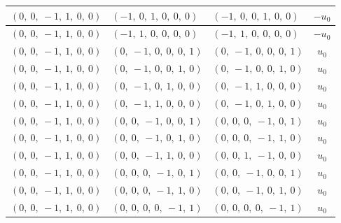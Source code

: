 \documentclass[11pt]{article}
\theoremstyle{definition}
\begin{document}
\begin{longtable}{|l|l|l|c|}
    \hline
    $\left( 0, \  0, \  -1, \  1, \  0, \  0\right)$ & $\left( -1, \  0, \  1, \  0, \  0, \  0\right)$ & $\left( -1, \  0, \  0, \  1, \  0, \  0\right)$ & $- u_{0}$ \\
    \hline
    $\left( 0, \  0, \  -1, \  1, \  0, \  0\right)$ & $\left( -1, \  1, \  0, \  0, \  0, \  0\right)$ & $\left( -1, \  1, \  0, \  0, \  0, \  0\right)$ & $- u_{0}$ \\
    \hline
    $\left( 0, \  0, \  -1, \  1, \  0, \  0\right)$ & $\left( 0, \  -1, \  0, \  0, \  0, \  1\right)$ & $\left( 0, \  -1, \  0, \  0, \  0, \  1\right)$ & $u_{0}$ \\
    \hline
    $\left( 0, \  0, \  -1, \  1, \  0, \  0\right)$ & $\left( 0, \  -1, \  0, \  0, \  1, \  0\right)$ & $\left( 0, \  -1, \  0, \  0, \  1, \  0\right)$ & $u_{0}$ \\
    \hline
    $\left( 0, \  0, \  -1, \  1, \  0, \  0\right)$ & $\left( 0, \  -1, \  0, \  1, \  0, \  0\right)$ & $\left( 0, \  -1, \  1, \  0, \  0, \  0\right)$ & $u_{0}$ \\
    \hline
    $\left( 0, \  0, \  -1, \  1, \  0, \  0\right)$ & $\left( 0, \  -1, \  1, \  0, \  0, \  0\right)$ & $\left( 0, \  -1, \  0, \  1, \  0, \  0\right)$ & $u_{0}$ \\
    \hline
    $\left( 0, \  0, \  -1, \  1, \  0, \  0\right)$ & $\left( 0, \  0, \  -1, \  0, \  0, \  1\right)$ & $\left( 0, \  0, \  0, \  -1, \  0, \  1\right)$ & $u_{0}$ \\
    \hline
    $\left( 0, \  0, \  -1, \  1, \  0, \  0\right)$ & $\left( 0, \  0, \  -1, \  0, \  1, \  0\right)$ & $\left( 0, \  0, \  0, \  -1, \  1, \  0\right)$ & $u_{0}$ \\
    \hline
    $\left( 0, \  0, \  -1, \  1, \  0, \  0\right)$ & $\left( 0, \  0, \  -1, \  1, \  0, \  0\right)$ & $\left( 0, \  0, \  1, \  -1, \  0, \  0\right)$ & $u_{0}$ \\
    \hline
    $\left( 0, \  0, \  -1, \  1, \  0, \  0\right)$ & $\left( 0, \  0, \  0, \  -1, \  0, \  1\right)$ & $\left( 0, \  0, \  -1, \  0, \  0, \  1\right)$ & $u_{0}$ \\
    \hline
    $\left( 0, \  0, \  -1, \  1, \  0, \  0\right)$ & $\left( 0, \  0, \  0, \  -1, \  1, \  0\right)$ & $\left( 0, \  0, \  -1, \  0, \  1, \  0\right)$ & $u_{0}$ \\
    \hline
    $\left( 0, \  0, \  -1, \  1, \  0, \  0\right)$ & $\left( 0, \  0, \  0, \  0, \  -1, \  1\right)$ & $\left( 0, \  0, \  0, \  0, \  -1, \  1\right)$ & $u_{0}$ \\

\end{longtable}
\end{document}
